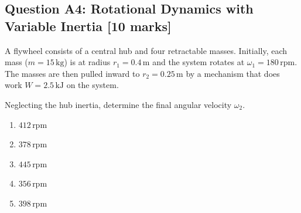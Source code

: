 \documentclass[12pt,a4paper]{article}
\begin{document}
\begin{questionbox}
\subsection*{Question A4: Rotational Dynamics with Variable Inertia [10 marks]}

A flywheel consists of a central hub and four retractable masses. Initially, each mass 
($m = 15\,\text{kg}$) is at radius $r_1 = 0.4\,\text{m}$ and the system rotates at 
$\omega_1 = 180\,\text{rpm}$. The masses are then pulled inward to $r_2 = 0.25\,\text{m}$ 
by a mechanism that does work $W = 2.5\,\text{kJ}$ on the system.

\begin{center}
\end{center}

Neglecting the hub inertia, determine the final angular velocity $\omega_2$.

\begin{mcqbox}
\begin{enumerate}[label=(\Alph*),leftmargin=*]
    \item $412\,\text{rpm}$
    \item $378\,\text{rpm}$
    \item $445\,\text{rpm}$
    \item $356\,\text{rpm}$
    \item $398\,\text{rpm}$
\end{enumerate}
\end{mcqbox}
\end{questionbox}
\end{document}

